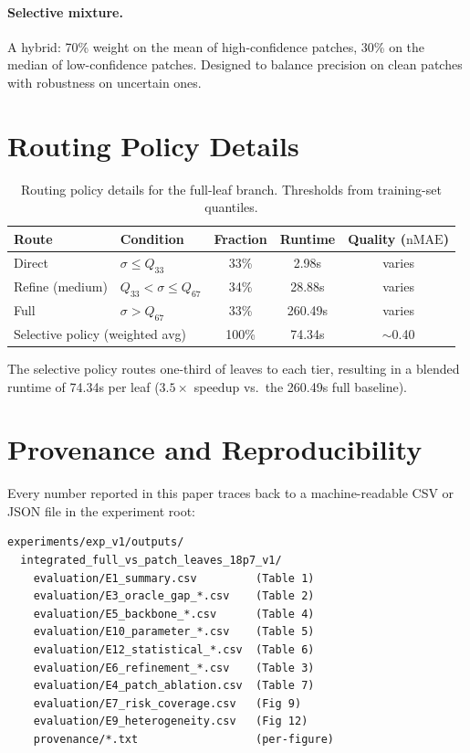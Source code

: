 \documentclass[11pt,a4paper]{article}
\newcommand{\nMAE}{\mathrm{nMAE}}
\begin{document}
\paragraph{Selective mixture.} A hybrid: 70\% weight on the mean of high-confidence patches, 30\% on the median of low-confidence patches. Designed to balance precision on clean patches with robustness on uncertain ones.


\section{Routing Policy Details}
\label{app:routing}

\begin{table}[h]
\centering
\caption{Routing policy details for the full-leaf branch. Thresholds from training-set quantiles.}
\label{tab:routing_detail}
\begin{tabular}{llccc}
\toprule
Route & Condition & Fraction & Runtime & Quality ($\nMAE$) \\
\midrule
Direct & $\sigma \leq Q_{33}$ & 33\% & 2.98s & varies \\
Refine (medium) & $Q_{33} < \sigma \leq Q_{67}$ & 34\% & 28.88s & varies \\
Full & $\sigma > Q_{67}$ & 33\% & 260.49s & varies \\
\midrule
\multicolumn{2}{l}{Selective policy (weighted avg)} & 100\% & 74.34s & $\sim$0.40 \\
\bottomrule
\end{tabular}
\end{table}

The selective policy routes one-third of leaves to each tier, resulting in a blended runtime of 74.34s per leaf ($3.5\times$ speedup vs.\ the 260.49s full baseline).


\section{Provenance and Reproducibility}
\label{app:provenance}

Every number reported in this paper traces back to a machine-readable CSV or JSON file in the experiment root:
\begin{verbatim}
experiments/exp_v1/outputs/
  integrated_full_vs_patch_leaves_18p7_v1/
    evaluation/E1_summary.csv         (Table 1)
    evaluation/E3_oracle_gap_*.csv    (Table 2)
    evaluation/E5_backbone_*.csv      (Table 4)
    evaluation/E10_parameter_*.csv    (Table 5)
    evaluation/E12_statistical_*.csv  (Table 6)
    evaluation/E6_refinement_*.csv    (Table 3)
    evaluation/E4_patch_ablation.csv  (Table 7)
    evaluation/E7_risk_coverage.csv   (Fig 9)
    evaluation/E9_heterogeneity.csv   (Fig 12)
    provenance/*.txt                  (per-figure)
\end{verbatim}
\end{document}
